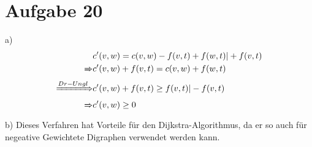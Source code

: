 \documentclass[a4paper,10pt,german]{scrartcl}
\begin{document}
\section{Aufgabe 20}
a)\\
\begin{align}
	&c'(v,w) = c(v,w) - f(v,t) + f(w,t) | + f(v,t)\\
	\xRightarrow{} &c'(v,w) + f(v,t) = c(v,w) + f(w,t)\\
	\xRightarrow{Dr-Ungl} &c'(v,w) + f(v,t) \ge f(v,t) | - f(v,t)\\
	\xRightarrow{} &c'(v,w) \ge 0
\end{align}
b) Dieses Verfahren hat Vorteile f\"ur den Dijkstra-Algorithmus, da er so auch f\"ur negeative Gewichtete Digraphen verwendet werden kann.
\end{document}
